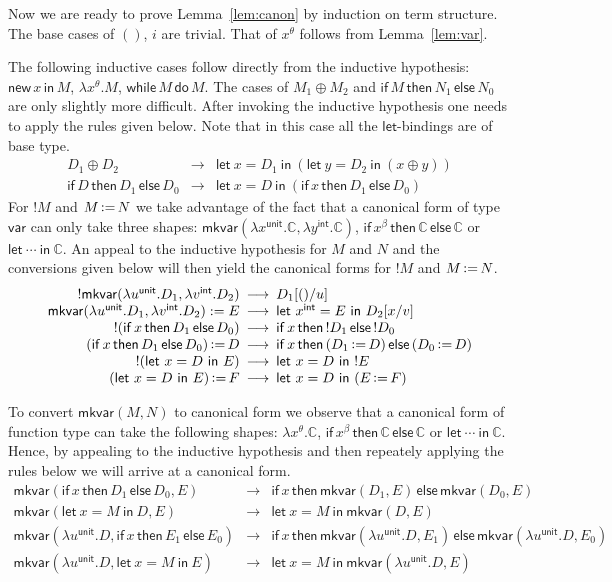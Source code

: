 \documentclass{CSML}
\theoremstyle{definition}\newtheorem{definition}[thm]{Definition}
\theoremstyle{definition}\newtheorem{example}[thm]{Example}
\theoremstyle{definition}\newtheorem{proposition}[thm]{Proposition}
\theoremstyle{definition}\newtheorem{lemma}[thm]{Lemma}
\theoremstyle{definition}\newtheorem{theorem}[thm]{Theorem}
\theoremstyle{definition}\newtheorem{corollary}[thm]{Corollary}
\theoremstyle{definition}\newtheorem{remark}[thm]{Remark}
\newcommand\lrarr\longrightarrow
\newcommand\letin[2]{\mathsf{let}\ #1\ \mathsf{in}\ #2}
\newcommand\badvar[2]{\mathsf{mkvar}(#1,#2)}
\newcommand{\aasg}{\,\raisebox{0.065ex}{:}{=}\,}
\newcommand\comt{\mathsf{unit}}
\newcommand\expt{\mathsf{int}}
\newcommand\vart{\mathsf{var}}
\newcommand\while[2]{\mathsf{while}\,#1\,\mathsf{do}\,#2}
\newcommand\cond[3]{\mathsf{if}\,#1\,\mathsf{then}\,#2\,\mathsf{else}\,#3}
\newcommand\new[2]{\mathsf{new}\,#1\,\mathsf{in}\,#2}
\newcommand\can{\mathbb{C}}
\begin{document}
\noindent
Now we are ready to prove Lemma~\ref{lem:canon} by induction on term structure.
The base cases of $()$, $i$ are trivial. That of $x^\theta$ follows from Lemma~\ref{lem:var}.

The following inductive cases follow directly from the inductive
hypothesis: $\new{x}{M}$, $\lambda x^\theta.M$, $\while{M}{M}$.
The cases of $M_1\oplus M_2$ and $\cond{M}{N_1}{N_0}$
are only slightly more difficult. After invoking the inductive
hypothesis one needs to apply the rules given below.
Note that in this case all the $\mathsf{let}$-bindings are of base type.
\renewcommand\arraystretch{1}
\[\begin{array}{rcl}
D_1\oplus D_2 &\!\!\!\lrarr\!\!\!& \letin{x=D_1}{(\letin{y=D_2}{(x\oplus y)})}\\
\cond{D}{D_1}{D_0}&\!\!\!\lrarr\!\!\! &\letin{x=D}{(\cond{x}{D_1}{D_0})}
\end{array}\]
For $!M$ and $M\aasg N$ we take advantage of the fact that
a canonical form of type $\vart$ can only take three shapes:
$\badvar{\lambda x^\comt.\can}{\lambda y^\expt.\can}$, 
$\cond{x^\beta}{\can}{\can}$ or $\letin{\cdots}{\can}$.
An appeal to the inductive hypothesis for $M$ and $N$ and the conversions
given below will then yield the canonical forms for $!M$ and $M\aasg N$.
\[\begin{array}{rcl}
! \badvar{\lambda u^\comt.D_1}{\lambda v^\expt.D_2} &\!\!\!\lrarr\!\!\!& D_1[()/u]\\
\badvar{\lambda u^\comt.D_1}{\lambda v^\expt.D_2}:= E &\!\!\!\lrarr\!\!\!& \letin{x^\expt=E}{D_2[x/v]}\\
!(\cond{x}{D_1}{D_0}) &\!\!\!\lrarr\!\!\! & \cond{x}{!D_1}{!D_0}\\
(\cond{x}{D_1}{D_0} )\aasg D &\!\!\!\lrarr\!\!\! & \cond{x}{(D_1\aasg D)}{(D_0\aasg D)}\\
!(\letin{x=D}{E}) &\!\!\!\lrarr\!\!\! & \letin{x=D}{!E}\\
 (\letin{x=D}{E})\aasg F &\!\!\!\lrarr\!\!\! & \letin{x=D}{(E\aasg F)} 
\end{array}\]

To convert $\badvar{M}{N}$ to canonical form we observe that
a canonical form of function type can take the following shapes:
$\lambda x^\theta.\can$, $\cond{x^\beta}{\can}{\can}$ or $\letin{\cdots}{\can}$.
Hence, by appealing to the inductive hypothesis and then repeately applying
the rules below we will arrive at a canonical form.
\[\begin{array}{rcl}
\!\!\badvar{\cond{x}{D_1}{D_0}}{E} &\!\!\!\lrarr\!\!\! & \cond{x}{\badvar{D_1}{E}}{\badvar{D_0}{E}}\\
\!\!\badvar{\letin{x=M}{D}}{E} &\!\!\!\lrarr\!\!\! & \letin{x=M}{\badvar{D}{E}}\\
\!\!\badvar{\lambda u^\comt\!. D}{\cond{x}{E_1}{E_0}} &\!\!\!\lrarr\!\!\! & \cond{x}{\badvar{\lambda u^\comt\!.D}{E_1}}{\badvar{\lambda u^\comt\!.D}{E_0}}\\
\!\!\badvar{\lambda u^\comt\!. D}{\letin{x=M}{E}}&\!\!\!\lrarr\!\!\! & \letin{x=M}{\badvar{\lambda u^\comt\!. D}{E}}
\end{array}\]
\end{document}
